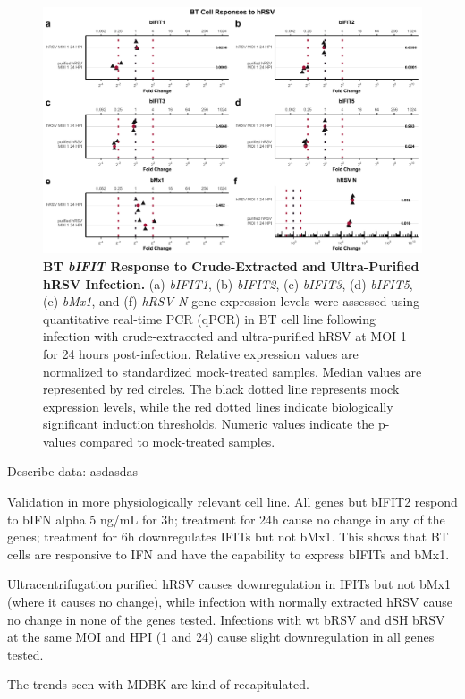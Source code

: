 \begin{figure}
    \centering
    \includegraphics[width=1\linewidth]{07. Chapter 2/Figs/02. Induction/10. bt_hrsv.pdf}
    \caption[BT \textit{bIFIT} Response to Crude-Extracted and Ultra-Purified hRSV Infection.]{\textbf{BT \textit{bIFIT} Response to Crude-Extracted and Ultra-Purified hRSV Infection.} (a) \textit{bIFIT1}, (b) \textit{bIFIT2}, (c) \textit{bIFIT3}, (d) \textit{bIFIT5}, (e) \textit{bMx1}, and (f) \textit{hRSV N} gene expression levels were assessed using quantitative real-time PCR (qPCR) in BT cell line following infection with crude-extraccted and ultra-purified hRSV at MOI 1 for 24 hours post-infection. Relative expression values are normalized to standardized mock-treated samples. Median values are represented by red circles. The black dotted line represents mock expression levels, while the red dotted lines indicate biologically significant induction thresholds. Numeric values indicate the p-values compared to mock-treated samples.}
    \label{fig:Bt responses to hRSV}
\end{figure}


Describe data: \newline
asdasdas

Validation in more physiologically relevant cell line. All genes but bIFIT2 respond to bIFN alpha 5 ng/mL for 3h; treatment for 24h cause no change in any of the genes; treatment for 6h downregulates IFITs but not bMx1. This shows that BT cells are responsive to IFN and have the capability to express bIFITs and bMx1.

Ultracentrifugation purified hRSV causes downregulation in IFITs but not bMx1 (where it causes no change), while infection with normally extracted hRSV cause no change in none of the genes tested. Infections with wt bRSV and dSH bRSV at the same MOI and HPI (1 and 24) cause slight downregulation in all genes tested.

The trends seen with MDBK are kind of recapitulated.

